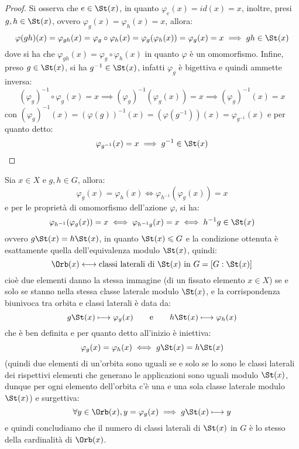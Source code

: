 \documentclass[11pt]{scrartcl}
\begin{document}
\begin{proof}
    Si osserva che $e \in \St(x)$, in quanto $\varphi_e(x) = id(x) = x$, inoltre, presi $g,h \in \St(x)$, ovvero $\varphi_g (x) = \varphi_h(x) = x$, allora:
        \[ \varphi(gh)(x) = \varphi_{gh}(x) = \varphi_g \circ \varphi_h (x) = \varphi_g(\varphi_h(x)) = \varphi_g(x) = x \implies gh \in \St(x)
            \]
    dove si ha che $ \varphi_{gh}(x) = \varphi_g \circ \varphi_h (x)$ in quanto $\varphi$ è un omomorfismo.
    Infine, preso $g \in \St(x)$, si ha $g^{-1} \in \St(x)$, infatti $\varphi_g$ è bigettiva e quindi ammette inversa:
        \[ (\varphi_g)^{-1} \circ \varphi_g (x) = x \implies (\varphi_g)^{-1}(\varphi_g(x)) = x \implies (\varphi_g)^{-1}(x) = x
            \]
    con $(\varphi_g)^{-1}(x) = (\varphi(g))^{-1}(x) = (\varphi(g^{-1}))(x) = \varphi_{g^{-1}}(x)$ e per quanto detto:
        \[ \varphi_{g^{-1}} (x) = x \implies g^{-1} \in \St(x)
            \]
\end{proof}

\pagebreak
\begin{remark}
    Sia $x \in X$ e $g,h \in G$, allora:
        \[ \varphi_g(x) = \varphi_h(x) \iff \varphi_{h^{-1}}(\varphi_g(x)) = x
            \]
    e per le proprietà di omomorfismo dell'azione $\varphi$, si ha:
        \[ \varphi_{h^{-1}}(\varphi_g(x)) = x \iff \varphi_{h^{-1}g}(x) = x \iff h^{-1}g \in \St(x)
            \]
    ovvero $g \St(x) = h \St(x)$, in quanto $\St(x) \leqslant G$ e la condizione ottenuta è esattamente quella dell'equivalenza modulo $\St(x)$,
    quindi:
    \[ \Orb(x) \longleftrightarrow \text{classi laterali di $\St(x)$ in $G$} = [G : \St(x)]
        \]
    cioè due elementi danno la stessa immagine (di un fissato elemento $x \in X$) se e solo se stanno nella stessa classe laterale modulo $\St(x)$, e la corrispondenza biunivoca tra orbita e classi
    laterali è data da:
    \[ g\St(x) \longmapsto \varphi_g(x) \qquad \text e \qquad h\St(x) \longmapsto \varphi_h(x)
                \]
    che è ben definita e per quanto detto all'inizio è iniettiva:
        \[ \varphi_g(x) = \varphi_h(x) \iff g\St(x) = h\St(x)
            \]
    (quindi due elementi di un'orbita sono uguali se e solo se lo sono le classi laterali dei rispettivi elementi che generano le applicazioni sono uguali modulo $\St(x)$, dunque per ogni elemento
    dell'orbita c'è una e una sola classe laterale modulo $\St(x)$) e surgettiva:
        \[ \forall y \in \Orb(x), y = \varphi_g(x) \implies g\St(x) \longmapsto y
            \]
    e quindi concludiamo che il numero di classi laterali di $\St(x)$ in $G$ è lo stesso della cardinalità di $\Orb(x)$.
\end{remark}
\end{document}
